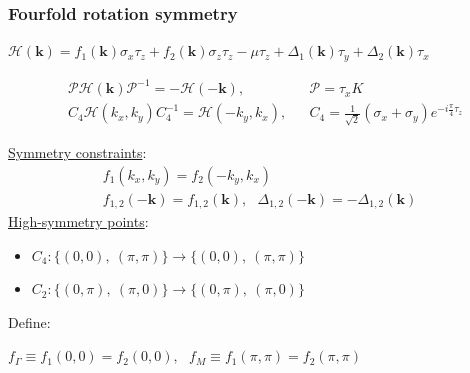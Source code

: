 \documentclass{beamer}
\newcommand{\mc}{\mathcal}
\renewcommand{\(}{\left(}
\renewcommand{\)}{\right)}
\renewcommand{\[}{\left[}
\renewcommand{\]}{\right]}
\begin{document}
\begin{frame}
    \frametitle{Fourfold rotation symmetry}
    \begin{center}
        $\mc H(\bm k) = f_1(\bm k) \sigma_x \tau_z + f_2(\bm k) \sigma_z \tau_z -\mu \tau_z + \Delta_1(\bm k) \tau_y + \Delta_2(\bm k) \tau_x$
    \end{center}
    \begin{align*}
        &\mc P \mc H(\bm k) \mc P^{-1} = -\mc H(-\bm k), && \mc P = \tau_x K \\
        &C_4 \mc H(k_x, k_y) C_4^{-1} = \mc H(-k_y, k_x), && C_4 = \frac{1}{\sqrt{2}} (\sigma_x + \sigma_y) e^{-i\frac{\pi}{4}\tau_z} \nonumber 
    \end{align*}

    \underline{Symmetry constraints}:
    \begin{gather*}
        f_{1}(k_x, k_y) = f_2(-k_y, k_x) \\ 
        f_{1,2}(-\bm k) = f_{1,2}(\bm k), \ \ \  \Delta_{1,2}(-\bm k) = -\Delta_{1,2}(\bm k)
    \end{gather*}\pause 
    \underline{High-symmetry points}: 
    \begin{itemize}
        \item $C_4 : \{(0,0),\  (\pi,\pi)\} \rightarrow \{(0,0),\  (\pi,\pi)\}$ 
        \item $C_2 : \{(0,\pi),\  (\pi,0)\} \rightarrow \{(0,\pi),\  (\pi,0)\}$ 
    \end{itemize}
    \vspace{10pt}
    Define: 

    $f_{\Gamma} \equiv f_{1}(0,0) = f_2(0,0), \ \ \  f_{M} \equiv f_{1}(\pi,\pi) = f_2(\pi,\pi)$
\end{frame}
\end{document}
